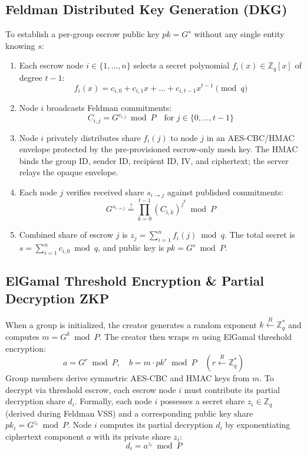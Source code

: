 \documentclass[11pt,a4paper]{article}
\begin{document}
\subsection{Feldman Distributed Key Generation (DKG)}
To establish a per-group escrow public key $pk = G^s$ without any single entity knowing $s$:
\begin{enumerate}
	\item Each escrow node $i \in \{1, \dots, n\}$ selects a secret polynomial $f_i(x) \in \mathbb{Z}_q[x]$ of degree $t-1$:
	      \[
		      f_i(x) = c_{i,0} + c_{i,1} x + \dots + c_{i,t-1} x^{t-1} \pmod q
	      \]
	\item Node $i$ broadcasts Feldman commitments:
	      \[
		      C_{i,j} = G^{c_{i,j}} \bmod P \quad \text{for } j \in \{0, \dots, t-1\}
	      \]
	\item Node $i$ privately distributes share $f_i(j)$ to node $j$ in an AES-CBC/HMAC envelope protected by the pre-provisioned escrow-only mesh key. The HMAC binds the group ID, sender ID, recipient ID, IV, and ciphertext; the server relays the opaque envelope.
	\item Each node $j$ verifies received share $s_{i \to j}$ against published commitments:
	      \[
		      G^{s_{i \to j}} \stackrel{?}{=} \prod_{k=0}^{t-1} \left(C_{i,k}\right)^{j^k} \bmod P
	      \]
	\item Combined share of escrow $j$ is $z_j = \sum_{i=1}^n f_i(j) \bmod q$. The total secret is $s = \sum_{i=1}^n c_{i,0} \bmod q$, and public key is $pk = G^s \bmod P$.
\end{enumerate}

\subsection{ElGamal Threshold Encryption \& Partial Decryption ZKP}
When a group is initialized, the creator generates a random exponent $k \xleftarrow{R} \mathbb{Z}_q^*$ and computes $m = G^k \bmod P$. The creator then wraps $m$ using ElGamal threshold encryption:
\[
	a = G^r \bmod P, \quad b = m \cdot pk^r \bmod P \quad (r \xleftarrow{R} \mathbb{Z}_q^*)
\]
Group members derive symmetric AES-CBC and HMAC keys from $m$. To decrypt via threshold escrow, each escrow node $i$ must contribute its partial decryption share $d_i$. Formally, each node $i$ possesses a secret share $z_i \in \mathbb{Z}_q$ (derived during Feldman VSS) and a corresponding public key share $pk_i = G^{z_i} \bmod P$. Node $i$ computes its partial decryption $d_i$ by exponentiating ciphertext component $a$ with its private share $z_i$:
\[
	d_i = a^{z_i} \bmod P
\]
\end{document}
